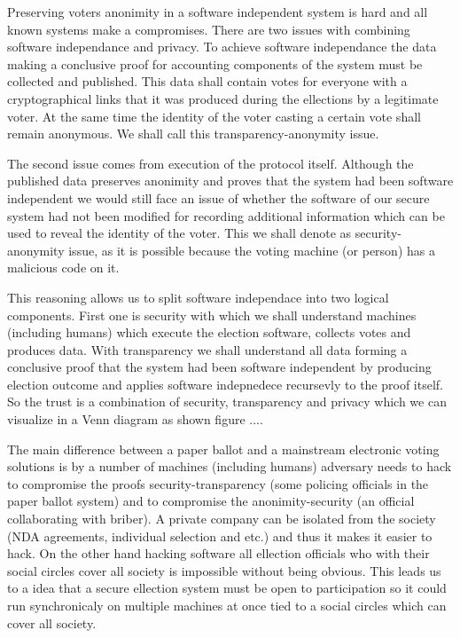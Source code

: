 \documentclass{article}
\begin{document}
Preserving voters anonimity in a software independent system is hard and all known systems make a compromises. There are two issues with combining software independance and privacy. To achieve software independance the data making a conclusive proof for accounting components of the system must be collected and published. This data shall contain votes for everyone with a cryptographical links that it was produced during the ellections by a legitimate voter. At the same time the identity of the voter casting a certain vote shall remain anonymous. We shall call this transparency-anonymity issue.

The second issue comes from execution of the protocol itself. Although the published data preserves anonimity and proves that the system had been software independent we would still face an issue of whether the software of our secure system had not been modified for recording additional information which can be used to reveal the identity of the voter. This we shall denote as security-anonymity issue, as it is possible because the voting machine (or person) has a malicious code on it.

This reasoning allows us to split software independace into two logical components. First one is security with which we shall understand machines (including humans) which execute the election software, collects votes and produces data. With transparency we shall understand all data forming a conclusive proof that the system had been software independent by producing election outcome and applies software indepnedece recursevly to the proof itself. So the trust is a combination of security, transparency and privacy which we can visualize in a Venn diagram as shown figure ....

The main difference between a paper ballot and a mainstream electronic voting solutions is by a number of machines (including humans) adversary needs to hack to compromise the proofs security-transparency (some policing officials in the paper ballot system) and to compromise the anonimity-security (an official collaborating with briber). A private company can be isolated from the society (NDA agreements, individual selection and etc.) and thus it makes it easier to hack. On the other hand hacking software all ellection officials who with their social circles cover all society is impossible without being obvious. This leads us to a idea that a secure ellection system must be open to participation so it could run synchronicaly on multiple machines at once tied to a social circles which can cover all society.
\end{document}
